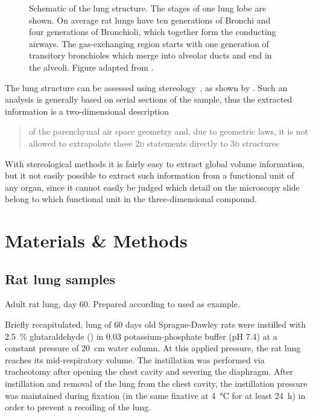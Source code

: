 \documentclass[%
	draft=true,
	paper=a4,%
	twoside=true,%
	abstract=true]{scrartcl}
\newlength\imagescale           %
\newcommand{\twod}{2\textsc{d}\xspace}
\newcommand{\threed}{3\textsc{d}\xspace}
\newcommand{\todojcs}[2][]{\todo[color=magenta!62!white, #1]{Johannes: #2}}
\begin{document}
\begin{figure}
%
	\caption{Schematic of the lung structure. The stages of one lung lobe are shown. On average rat lungs have ten generations of Bronchi and four generations of Bronchioli, which together form the conducting airways. The gas-exchanging region starts with one generation of transitory bronchioles which merge into alveolar ducts and end in the alveoli. Figure adapted from \cite{Schittny2007a}.}
	\label{fig:acinus schematic}%
\end{figure}

The lung structure can be assessed using stereology~\cite{Hsia2010}, as shown by \citet{Tschanz2002}. Such an analysis is generally based on serial sections of the sample, thus the extracted information is a two-dimensional description \blockquote[\cite{Tschanz2002}]{of the parenchymal air space geometry and, due to geometric laws, it is not allowed to extrapolate these \twod statements directly to \threed structures}. With stereological methods it is fairly easy to extract global volume information\todojcs{From a region, from a ROI?}, but it not easily possible to extract such information from a functional unit of any organ, since it cannot easily be judged which detail on the microscopy slide belong to which functional unit in the three-dimensional compound.

\section{Materials \& Methods}\label{sec:MM}
\subsection{Rat lung samples}
Adult rat lung, day 60. Prepared according to \cite{Tschanz2002,Luyet2002} used as example.

Briefly recapitulated, lung of 60 days old Sprague-Dawley rats were instilled with \SI{2.5}{\percent} glutaraldehyde () in \SI{0.03}{\Molar} potassium-phosphate buffer (pH 7.4) at a constant pressure of \SI{20}{\centi\meter} water column. At this applied pressure, the rat lung reaches its mid-respiratory volume. The instillation was performed via tracheotomy after opening the chest cavity and severing the diaphragm. After instillation and removal of the lung from the chest cavity, the instillation pressure was maintained during fixation (in the same fixative at \SI{4}{\celsius} for at least \SI{24}{\hour}) in order to prevent a recoiling of the lung.
\end{document}
